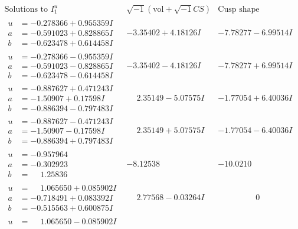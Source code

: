\documentclass[1p]{elsarticle_modified}
\theoremstyle{definition}
\newcommand{\I}{\sqrt{-1}}
\begin{document}
$$\begin{array}{c|c|c}  
\text{Solutions to }I^u_{1}& \I (\text{vol} + \sqrt{-1}CS) & \text{Cusp shape}\\
 \hline 
\begin{aligned}
u &= -0.278366 + 0.955359 I \\
a &= -0.591023 + 0.828865 I \\
b &= -0.623478 + 0.614458 I\end{aligned}
 & -3.35402 + 4.18126 I & -7.78277 - 6.99514 I \\ \hline\begin{aligned}
u &= -0.278366 - 0.955359 I \\
a &= -0.591023 - 0.828865 I \\
b &= -0.623478 - 0.614458 I\end{aligned}
 & -3.35402 - 4.18126 I & -7.78277 + 6.99514 I \\ \hline\begin{aligned}
u &= -0.887627 + 0.471243 I \\
a &= -1.50907 + 0.17598 I \\
b &= -0.886394 - 0.797483 I\end{aligned}
 & \phantom{-}2.35149 - 5.07575 I & -1.77054 + 6.40036 I \\ \hline\begin{aligned}
u &= -0.887627 - 0.471243 I \\
a &= -1.50907 - 0.17598 I \\
b &= -0.886394 + 0.797483 I\end{aligned}
 & \phantom{-}2.35149 + 5.07575 I & -1.77054 - 6.40036 I \\ \hline\begin{aligned}
u &= -0.957964\phantom{ +0.000000I} \\
a &= -0.302923\phantom{ +0.000000I} \\
b &= \phantom{-}1.25836\phantom{ +0.000000I}\end{aligned}
 & -8.12538\phantom{ +0.000000I} & -10.0210\phantom{ +0.000000I} \\ \hline\begin{aligned}
u &= \phantom{-}1.065650 + 0.085902 I \\
a &= -0.718491 + 0.083392 I \\
b &= -0.515563 + 0.600875 I\end{aligned}
 & \phantom{-}2.77568 - 0.03264 I & \phantom{-0.000000 } 0 \\ \hline\begin{aligned}
u &= \phantom{-}1.065650 - 0.085902 I \\

\end{aligned}
\end{array}$$
\end{document}
